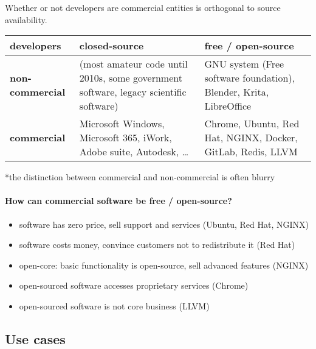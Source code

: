 \documentclass[12pt]{article}
\begin{document}
Whether or not developers are commercial entities is orthogonal to source availability.

\begin{tabular}{>{\bfseries}l l l}
developers & closed-source & free / open-source \\
\hline
non-commercial & (most amateur code until 2010s, some government software, legacy scientific software) & GNU system (Free software foundation), Blender, Krita, LibreOffice \\
commercial & Microsoft Windows, Microsoft 365, iWork, Adobe suite, Autodesk, \ldots & Chrome, Ubuntu, Red Hat, NGINX, Docker, GitLab, Redis, LLVM \\
\end{tabular}
*the distinction between commercial and non-commercial is often blurry

\paragraph{How can commercial software be free / open-source?}
\begin{itemize}
    \item software has zero price, sell support and services (Ubuntu, Red Hat, NGINX)
    \item software costs money, convince customers not to redistribute it (Red Hat)
    \item open-core: basic functionality is open-source, sell advanced features (NGINX)
    \item open-sourced software accesses proprietary services (Chrome)
    \item open-sourced software is not core business (LLVM)
\end{itemize}

\subsection{Use cases}
\end{document}
